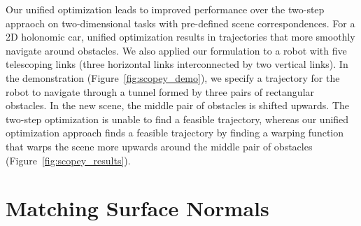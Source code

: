 \documentclass{article}
\begin{document}
Our unified optimization leads to improved performance over the two-step appraoch on two-dimensional tasks with pre-defined scene correspondences. For a 2D holonomic car, unified optimization results in trajectories that more smoothly navigate around obstacles. We also applied our formulation to a robot with five telescoping links (three horizontal links interconnected by two vertical links). In the demonstration (Figure~\ref{fig:scopey_demo}), we specify a trajectory for the robot to navigate through a tunnel formed by three pairs of rectangular obstacles. In the new scene, the middle pair of obstacles is shifted upwards. The two-step optimization is unable to find a feasible trajectory, whereas our unified optimization approach finds a feasible trajectory by finding a warping function that warps the scene more upwards around the middle pair of obstacles (Figure~\ref{fig:scopey_results}).

\section{Matching Surface Normals}
\end{document}

